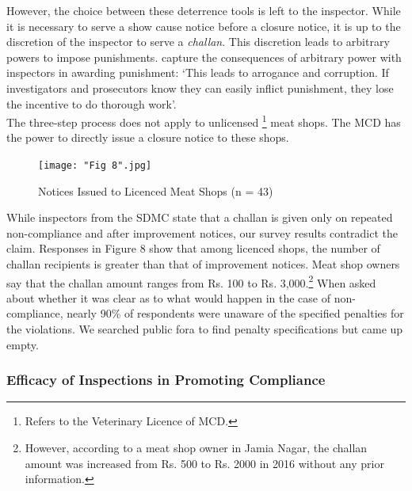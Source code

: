 \documentclass[a4paper, 12pt]{article}
\begin{document}
However, the choice between these deterrence tools is left to the inspector. While it is necessary to serve a show cause notice before a closure notice, it is up to the discretion of the inspector to serve a \textit{challan}. This discretion leads to arbitrary powers to impose punishments. \cite{roychapter} capture the consequences of arbitrary power with inspectors in awarding punishment: ‘This leads to arrogance and corruption. If investigators and prosecutors know they can easily inflict punishment, they lose the incentive to do thorough work’.\\

The three-step process does not apply to unlicensed \footnote{ Refers to the Veterinary Licence of MCD.} meat shops. The MCD has the power to directly issue a closure notice to these shops.

\begin{figure}[H]
\centering
\texttt{[image: "Fig 8".jpg]}
\caption[Optional Caption]{Notices Issued to Licenced Meat Shops (n = 43)\footnotemark }
\end{figure}

While inspectors from the SDMC state that a challan is given only on repeated non-compliance and after improvement notices, our survey results contradict the claim. Responses in Figure 8 show that among licenced shops, the number of challan recipients is greater than that of improvement notices. Meat shop owners say that the challan amount ranges from Rs. 100 to Rs. 3,000.\footnote{However, according to a meat shop owner in Jamia Nagar, the challan amount was increased from Rs. 500 to Rs. 2000 in 2016 without any prior information.} When asked about whether it was clear as to what would happen in the case of non-compliance, nearly 90\% of respondents were unaware of the specified penalties for the violations. We searched public fora to find penalty specifications but came up empty.

\subsubsection{Efficacy of Inspections in Promoting Compliance}
\end{document}
